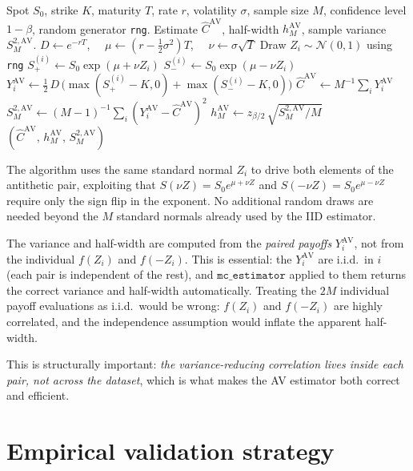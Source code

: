 \documentclass[11pt,a4paper]{article}
\theoremstyle{plain}
\theoremstyle{definition}
\theoremstyle{remark}
\begin{document}
\begin{algorithm}[H]
\caption{Antithetic-variates Monte Carlo for the European call (exact GBM)}
\label{alg:mc-av}
\begin{algorithmic}[1]
\Require Spot $S_0$, strike $K$, maturity $T$, rate $r$, volatility
$\sigma$, sample size $M$, confidence level $1 - \beta$, random
generator \texttt{rng}.
\Ensure Estimate $\hat C^{\mathrm{AV}}$, half-width $h_M^{\mathrm{AV}}$,
sample variance $S_M^{2,\mathrm{AV}}$.
\State $D \gets e^{-rT}$,
$\quad \mu \gets (r - \tfrac{1}{2} \sigma^2) T$,
$\quad \nu \gets \sigma \sqrt T$
\State Draw $Z_i \sim \mathcal{N}(0, 1)$ using \texttt{rng}
\State $S_+^{(i)} \gets S_0 \exp(\mu + \nu Z_i)$
\State $S_-^{(i)} \gets S_0 \exp(\mu - \nu Z_i)$
\State $Y_i^{\mathrm{AV}} \gets \tfrac{1}{2}\,D\,
\bigl(\max(S_+^{(i)} - K, 0) + \max(S_-^{(i)} - K, 0)\bigr)$
\EndFor
\State $\hat C^{\mathrm{AV}} \gets M^{-1} \sum_i Y_i^{\mathrm{AV}}$
\State $S_M^{2,\mathrm{AV}} \gets (M-1)^{-1} \sum_i (Y_i^{\mathrm{AV}}
- \hat C^{\mathrm{AV}})^2$
\State $h_M^{\mathrm{AV}} \gets z_{\beta/2}\,
\sqrt{S_M^{2,\mathrm{AV}}/M}$
\State \Return $(\hat C^{\mathrm{AV}},\, h_M^{\mathrm{AV}},\, S_M^{2,\mathrm{AV}})$
\end{algorithmic}
\end{algorithm}

The algorithm uses the same standard normal $Z_i$ to drive both
elements of the antithetic pair, exploiting that $S(\nu Z) = S_0
e^{\mu + \nu Z}$ and $S(-\nu Z) = S_0 e^{\mu - \nu Z}$ require only
the sign flip in the exponent. No additional random draws are
needed beyond the $M$ standard normals already used by the IID
estimator.

The variance and half-width are computed from the \emph{paired
payoffs} $Y_i^{\mathrm{AV}}$, not from the individual $f(Z_i)$ and
$f(-Z_i)$. This is essential: the $Y_i^{\mathrm{AV}}$ are i.i.d.\ in
$i$ (each pair is independent of the rest), and $\mathtt{mc\_estimator}$
applied to them returns the correct variance and half-width
automatically. Treating the $2M$ individual payoff evaluations as
i.i.d.\ would be wrong: $f(Z_i)$ and $f(-Z_i)$ are highly correlated,
and the independence assumption would inflate the apparent half-width.

This is structurally important: \emph{the variance-reducing
correlation lives inside each pair, not across the dataset}, which
is what makes the AV estimator both correct and efficient.

\section{Empirical validation strategy}
\label{sec:validation}
\end{document}
